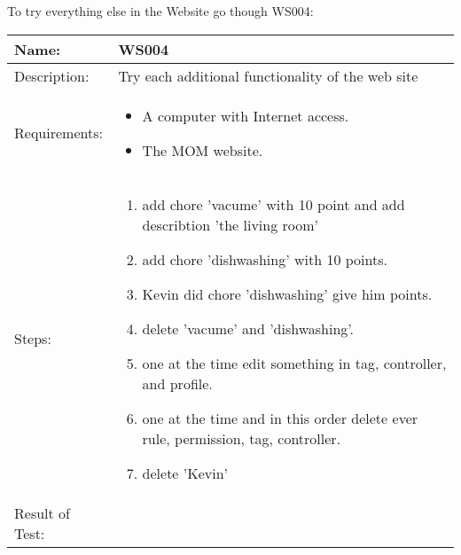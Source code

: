 To try everything else in the Website go though WS004:
\begin{table}[h]
	\centering
		\begin{tabular*}{\textwidth}{|l|l|}
		\hline
		\hline
		Name: & WS004\\
		\hline
		Description: & \parbox{0.70\textwidth}{Try each additional functionality of the web site}\\
		\hline
		Requirements: & \parbox{0.70\textwidth}{
		\begin{itemize}
			\item A computer with Internet access.
			\item The MOM website.
		\end{itemize}}
		\\
		\hline
		Steps: & \parbox{.70\textwidth}{
		\begin{enumerate}
			\item add chore 'vacume' with 10 point and add describtion 'the living room'
			\item add chore 'dishwashing' with 10 points.
			\item Kevin did chore 'dishwashing' give him points.
			\item delete 'vacume' and 'dishwashing'.
			\item one at the time edit something in tag, controller, and profile.
			\item one at the time and in this order delete ever rule, permission, tag, controller.
			\item delete 'Kevin'	
		\end{enumerate}}
		\\		
		\hline
		Result of Test: & \\
		\hline
		\end{tabular*}
\end{table}